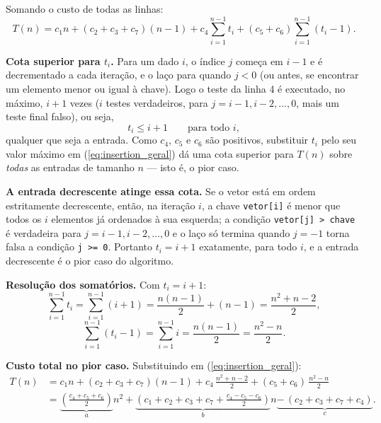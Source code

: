 \qquad Somando o custo de todas as linhas:
\begin{equation}
T(n) = c_1 n + (c_2+c_3+c_7)(n-1) + c_4\sum_{i=1}^{n-1} t_i
        + (c_5+c_6)\sum_{i=1}^{n-1} (t_i - 1).
\label{eq:insertion_geral}
\end{equation}

\qquad \textbf{Cota superior para $t_i$.} Para um dado $i$, o índice $j$
começa em $i-1$ e é decrementado a cada iteração, e o laço para quando
$j < 0$ (ou antes, se encontrar um elemento menor ou igual à chave).
Logo o teste da linha 4 é executado, no máximo, $i+1$ vezes
($i$ testes verdadeiros, para $j = i-1, i-2, \ldots, 0$, mais um teste
final falso), ou seja,
\begin{equation}
t_i \le i+1 \qquad \text{para todo } i,
\label{eq:cota_ti}
\end{equation}
qualquer que seja a entrada. Como $c_4$, $c_5$ e $c_6$ são positivos,
substituir $t_i$ pelo seu valor máximo em (\ref{eq:insertion_geral})
dá uma cota superior para $T(n)$ sobre \textit{todas} as entradas de
tamanho $n$ --- isto é, o pior caso.

\qquad \textbf{A entrada decrescente atinge essa cota.} Se o vetor está
em ordem estritamente decrescente, então, na iteração $i$, a chave
\texttt{vetor[i]} é menor que todos os $i$ elementos já ordenados à sua
esquerda; a condição \texttt{vetor[j] > chave} é verdadeira para
$j = i-1, i-2, \ldots, 0$ e o laço só termina quando $j = -1$ torna
falsa a condição \texttt{j >= 0}. Portanto $t_i = i+1$ exatamente,
para todo $i$, e a entrada decrescente é o pior caso do algoritmo.

\qquad \textbf{Resolução dos somatórios.} Com $t_i = i+1$:
\begin{equation}
\sum_{i=1}^{n-1} t_i = \sum_{i=1}^{n-1} (i+1)
 = \frac{n(n-1)}{2} + (n-1) = \frac{n^2+n-2}{2},
\end{equation}
\begin{equation}
\sum_{i=1}^{n-1} (t_i - 1) = \sum_{i=1}^{n-1} i = \frac{n(n-1)}{2}
 = \frac{n^2-n}{2}.
\end{equation}

\qquad \textbf{Custo total no pior caso.} Substituindo em
(\ref{eq:insertion_geral}):
\begin{align}
T(n) &= c_1 n + (c_2+c_3+c_7)(n-1)
        + c_4\,\frac{n^2+n-2}{2} + (c_5+c_6)\,\frac{n^2-n}{2} \nonumber \\[4pt]
     &= \underbrace{\left(\frac{c_4+c_5+c_6}{2}\right)}_{a} n^2
      + \underbrace{\left(c_1+c_2+c_3+c_7+\frac{c_4-c_5-c_6}{2}\right)}_{b} n
      \underbrace{-\,(c_2+c_3+c_7+c_4)}_{c}.
\label{eq:insertion_pior}
\end{align}

